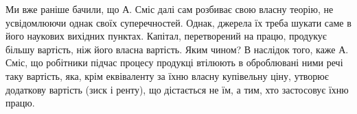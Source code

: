 Ми вже раніше бачили, що А. Сміс далі сам розбиває свою власну
теорію, не усвідомлюючи однак своїх суперечностей. Однак, джерела їх
треба шукати саме в його наукових вихідних пунктах. Капітал, перетворений
на працю, продукує більшу вартість, ніж його власна вартість.
Яким чином? В наслідок того, каже А. Сміс, що робітники підчас процесу
продукці втілюють в оброблювані ними речі таку вартість, яка,
крім еквіваленту за їхню власну купівельну ціну, утворює додаткову вартість
(зиск і ренту), що дістається не їм, а тим, хто застосовує їхню працю.
\parbreak{}  %
